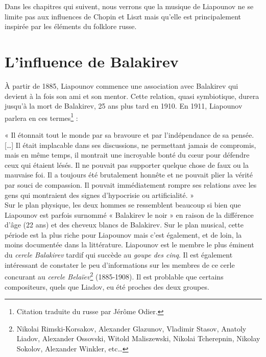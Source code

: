 Dans les chapitres qui suivent, nous verrons que la musique de Liapounov ne se limite pas aux influences de Chopin et Liszt mais qu'elle est principalement inspirée par les éléments du folklore russe.

\section{L'influence de Balakirev}

À partir de 1885, Liapounov commence une association avec Balakirev qui devient à la fois son ami et son mentor. Cette relation, quasi symbiotique, durera jusqu'à la mort de Balakirev, 25 ans plus tard en 1910. En 1911, Liapounov parlera en ces termes\footnote{Citation traduite du russe par Jérôme Odier.} :

« Il étonnait tout le monde par sa bravoure et par l'indépendance de sa pensée. [\dots] Il était implacable dans ses discussions, ne permettant jamais de compromis, mais en même temps, il montrait une incroyable bonté du cœur pour défendre ceux qui étaient lésés. Il ne pouvait pas supporter quelque chose de faux ou la mauvaise foi. Il a toujours été brutalement honnête et ne pouvait plier la vérité par souci de compassion. Il pouvait immédiatement rompre ses relations avec les gens qui montraient des signes d'hypocrisie ou artificialité. »\\

Sur le plan physique, les deux hommes se ressemblent beaucoup si bien que Liapounov est parfois surnommé « Balakirev le noir » en raison de la différence d'âge (22 ans) et des cheveux blancs de Balakirev. Sur le plan musical, cette période est la plus riche pour Liapounov mais c'est également, et de loin, la moins documentée dans la littérature. Liapounov est le membre le plus éminent du \emph{cercle Balakirev} tardif qui succède au \emph{goupe des cinq}. Il est également intéressant de constater le peu d'informations sur les membres de ce cerle concurant au \emph{cercle Belaïev}\footnote{Nikolai Rimski-Korsakov, Alexander Glazunov, Vladimir Stasov, Anatoly Liadov, Alexander Ossovski, Witold Maliszewski, Nikolai Tcherepnin, Nikolay Sokolov, Alexander Winkler, etc\dots} (1885-1908). Il est problable que certains compositeurs, quels que Liadov, eu été proches des deux groupes.\\

